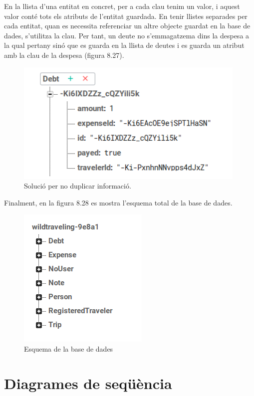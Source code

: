 En la llista d'una entitat en concret, per a cada clau tenim un valor, i aquest valor conté tots els atributs de l'entitat guardada. En tenir llistes separades per cada entitat, quan es necessita referenciar un altre objecte guardat en la base de dades, s'utilitza la clau. Per tant, un deute no s'emmagatzema dins la despesa a la qual pertany sinó que es guarda en la llista de deutes i es guarda un atribut amb la clau de la despesa (figura 8.27).

\begin{figure}[!h]
\centering
\includegraphics[scale=1.00]{Figures/DebtBD.jpg}
\caption{Solució per no duplicar informació.}
\end{figure}

\clearpage

Finalment, en la figura 8.28 es mostra l'esquema total de la base de dades.

\begin{figure}[!h]
\centering
\includegraphics[scale=1.00]{Figures/esquemabdGeneral.png}
\caption{Esquema de la base de dades}
\end{figure}

\section{Diagrames de seqüència}

